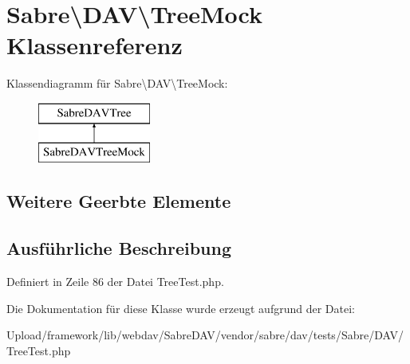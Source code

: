 \hypertarget{class_sabre_1_1_d_a_v_1_1_tree_mock}{}\section{Sabre\textbackslash{}D\+AV\textbackslash{}Tree\+Mock Klassenreferenz}
\label{class_sabre_1_1_d_a_v_1_1_tree_mock}
Klassendiagramm für Sabre\textbackslash{}D\+AV\textbackslash{}Tree\+Mock\+:\begin{figure}[H]
\begin{center}
\leavevmode
\includegraphics[height=2.000000cm]{class_sabre_1_1_d_a_v_1_1_tree_mock}
\end{center}
\end{figure}
\subsection*{Weitere Geerbte Elemente}


\subsection{Ausführliche Beschreibung}


Definiert in Zeile 86 der Datei Tree\+Test.\+php.



Die Dokumentation für diese Klasse wurde erzeugt aufgrund der Datei\+:\begin{DoxyCompactItemize}
\item 
Upload/framework/lib/webdav/\+Sabre\+D\+A\+V/vendor/sabre/dav/tests/\+Sabre/\+D\+A\+V/Tree\+Test.\+php\end{DoxyCompactItemize}
